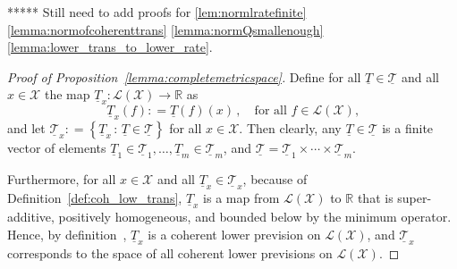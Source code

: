 \documentclass[10pt]{paper}
\theoremstyle{definition}
\newcommand{\reals}{\mathbb{R}}
\newcommand{\states}{\mathcal{X}}
\newcommand{\lt}{\underline{T}}
\newcommand{\gambles}{\mathcal{L}}
\newcommand{\gamblesX}{\gambles(\states)}
\newcommand{\coloneqq}{:\!=}
\begin{document}
***** Still need to add proofs for \ref{lem:normlratefinite} \ref{lemma:normofcoherenttrans} \ref{lemma:normQsmallenough} \ref{lemma:lower_trans_to_lower_rate}.

\begin{proof}[Proof of Proposition~\ref{lemma:completemetricspace}]
Define for all $\lt\in\underline{\mathcal{T}}$ and all $x\in\states$ the map $\lt_x:\gamblesX\rightarrow\reals$ as
\begin{equation*}
\lt_x(f) \coloneqq \lt(f)(x)\,,\quad\text{for all $f\in\gamblesX$,}
\end{equation*}
and let $\underline{\mathcal{T}}_x\coloneqq\left\{\lt_x\,:\,\lt\in\underline{\mathcal{T}}\right\}$ for all $x\in\states$. Then clearly, any $\lt\in\underline{\mathcal{T}}$ is a finite vector of elements $\lt_1\in\underline{\mathcal{T}}_1,\ldots,\lt_m\in\underline{\mathcal{T}}_m$, and $\underline{\mathcal{T}}=\underline{\mathcal{T}}_1\times\cdots\times \underline{\mathcal{T}}_m$.

Furthermore, for all $x\in\states$ and all $\lt_x\in\underline{\mathcal{T}}_x$, because of Definition~\ref{def:coh_low_trans}, $\lt_x$ is a map from $\gamblesX$ to $\reals$ that is super-additive, positively homogeneous, and bounded below by the minimum operator. Hence, by definition~\cite[Definition~2.3.3]{Walley:1991vk}, $\lt_x$ is a coherent lower prevision on $\gamblesX$, and $\underline{\mathcal{T}}_x$ corresponds to the space of all coherent lower previsions on $\gamblesX$.


\end{proof}
\end{document}

